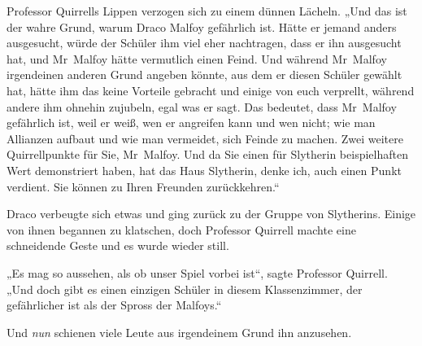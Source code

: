 Professor Quirrells Lippen verzogen sich zu einem dünnen Lächeln. „Und das ist der wahre Grund, warum Draco Malfoy gefährlich ist. Hätte er jemand anders ausgesucht, würde der Schüler ihm viel eher nachtragen, dass er ihn ausgesucht hat, und Mr~Malfoy hätte vermutlich einen Feind. Und während Mr~Malfoy irgendeinen anderen Grund angeben könnte, aus dem er diesen Schüler gewählt hat, hätte ihm das keine Vorteile gebracht und einige von euch verprellt, während andere ihm ohnehin zujubeln, egal was er sagt. Das bedeutet, dass Mr~Malfoy gefährlich ist, weil er weiß, wen er angreifen kann und wen nicht; wie man Allianzen aufbaut und wie man vermeidet, sich Feinde zu machen. Zwei weitere Quirrellpunkte für Sie, Mr~Malfoy. Und da Sie einen für Slytherin beispielhaften Wert demonstriert haben, hat das Haus Slytherin, denke ich, auch einen Punkt verdient. Sie können zu Ihren Freunden zurückkehren.“

Draco verbeugte sich etwas und ging zurück zu der Gruppe von Slytherins. Einige von ihnen begannen zu klatschen, doch Professor Quirrell machte eine schneidende Geste und es wurde wieder still.

„Es mag so aussehen, als ob unser Spiel vorbei ist“, sagte Professor Quirrell. „Und doch gibt es einen einzigen Schüler in diesem Klassenzimmer, der gefährlicher ist als der Spross der Malfoys.“

Und \emph{nun} schienen viele Leute aus irgendeinem Grund ihn anzusehen.

